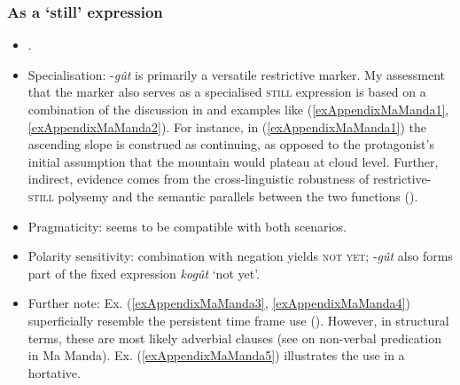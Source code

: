 \subsubsection{As a \lq{}still\rq{ }expression}
\label{appendixMaMandaStill}
\begin{itemize}
	\item \textcite[125–126, 166–167, 202]{Pennington2016}.
	\item Specialisation: -\textit{gût} is primarily a versatile restrictive marker. My assessment that the marker also serves as a specialised \textsc{still} expression is based on a combination of the discussion in \textcite{Pennington2016} and examples like (\ref{exAppendixMaManda1}, \ref{exAppendixMaManda2}). For instance, in (\ref{exAppendixMaManda1}) the ascending slope is construed as continuing, as opposed to the protagonist's initial assumption that the mountain would plateau at cloud level. Further, indirect, evidence comes from the cross-linguistic robustness of restrictive-\textsc{still} polysemy and the semantic parallels between the two functions ().
	\item Pragmaticity: seems to be compatible with both scenarios.
	\item Polarity sensitivity: combination with negation yields \textsc{not yet}; -\textit{gût} also forms part of the fixed expression \textit{kogût} \lq not yet'.
	\item Further note: Ex. (\ref{exAppendixMaManda3}, \ref{exAppendixMaManda4}) superficially resemble the persistent time frame use (). However, in structural terms, these are most likely adverbial clauses (see \cite[445–450]{Pennington2016} on non-verbal predication in Ma Manda). Ex. (\ref{exAppendixMaManda5}) illustrates the use in a hortative.
\end{itemize}

